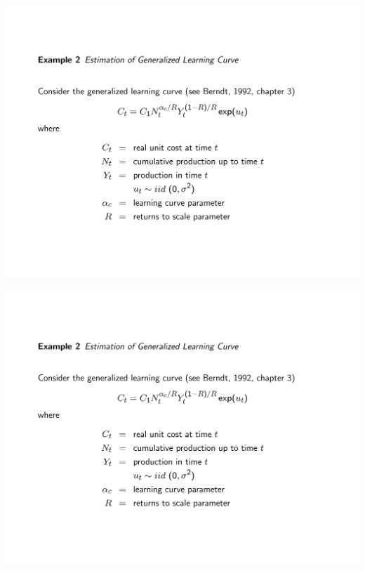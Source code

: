 \begin{frame}[plain]{}
	\includegraphics[page=4,trim={2cm 2cm 2cm 2cm},clip,width=\textwidth]{./resources/zivotLearning.pdf}
\end{frame}

\begin{frame}[plain]{}
	\includegraphics[page=5,trim={2cm 2cm 2cm 2cm},clip,width=\textwidth]{./resources/zivotLearning.pdf}
\end{frame}

